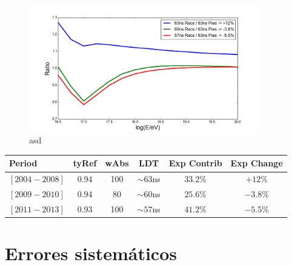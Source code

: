 	\begin{figure}[h!]
		\begin{center}
			\includegraphics[width=0.9\textwidth]{fig/resultadosAuger/exposure_Arrays}
			\caption{asd}
			\label{fig:}
		\end{center}
	\end{figure}
	
	\begin{table}[h!]
	\centering
	 \begin{tabular}{l|ccc|c|c}
				Period       & tyRef & wAbs & LDT        & Exp Contrib  &   Exp Change \\
				\hline
				$[2004 - 2008]$ & 0.94  & 100  & $\sim63$ns & $33.2\%$     &   $+12\%$ \\
				$[2009 - 2010]$ & 0.94  & 80   & $\sim60$ns & $25.6\%$     &   $-3.8\%$\\
				$[2011 - 2013]$ & 0.93  & 100  & $\sim57$ns & $41.2\%$     &   $-5.5\%$\\
			\end{tabular}
	\end{table}
	
	
\section{Errores sistem\'aticos}
			
